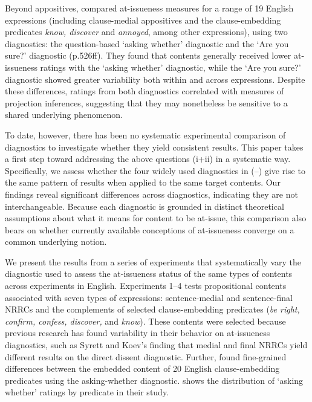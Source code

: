 \documentclass[times,linguex,xcolor]{glossa}
\begin{document}
  Beyond appositives, \citealt{tonhauser_how_2018} compared at-issueness measures for a range of 19 English expressions (including clause-medial appositives and the clause-embedding predicates \emph{know, discover} and \emph{annoyed}, among other expressions), using two diagnostics: the question-based `asking whether' diagnostic and the `Are you sure?' diagnostic (p.526ff). They found that contents generally received lower at-issueness ratings with the `asking whether' diagnostic, while the `Are you sure?' diagnostic showed greater variability both within and across expressions. Despite these differences, ratings from both diagnostics correlated with measures of projection inferences, suggesting that they may nonetheless be sensitive to a shared underlying phenomenon.

  To date, however, there has been no systematic experimental comparison of diagnostics to investigate whether they yield consistent results. This paper takes a first step toward addressing the above questions (i+ii) in a systematic way. Specifically, we assess whether the four widely used diagnostics in (--) give rise to the same pattern of results when applied to the same target contents. Our findings reveal significant differences across diagnostics, indicating they are not interchangeable. Because each diagnostic is grounded in distinct theoretical assumptions about what it means for content to be at-issue, this comparison also bears on whether currently available conceptions of at-issueness converge on a common underlying notion.

  We present the results from a series of experiments that systematically vary the diagnostic used to assess the at-issueness status of the same types of contents across experiments in English. Experiments 1--4 tests propositional contents associated with seven types of expressions: sentence-medial and sentence-final NRRCs and the complements of selected clause-embedding predicates (\emph{be right, confirm, confess, discover,} and \emph{know}). These contents were selected because previous research has found variability in their behavior on at-issueness diagnostics, such as Syrett and Koev's finding that medial and final NRRCs yield different results on the direct dissent diagnostic. Further, \citealt{degen-tonhauser-glossa} found fine-grained differences between the embedded content of 20 English clause-embedding predicates using the asking-whether diagnostic.  shows the distribution of `asking whether' ratings by predicate in their study.
\end{document}
